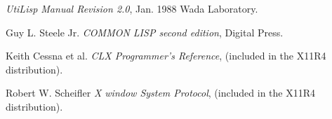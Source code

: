 \begin{thebibliography}{9}
 {\em UtiLisp Manual Revision 2.0}, Jan. 1988 Wada
Laboratory.

 Guy L. Steele Jr. {\em COMMON LISP second
edition}, Digital Press.

 Keith Cessna et al. {\em CLX Programmer's Reference},
(included in the  X11R4 distribution).

 Robert W. Scheifler {\em X window System Protocol},
(included in the X11R4 distribution).
\end{thebibliography}

%


